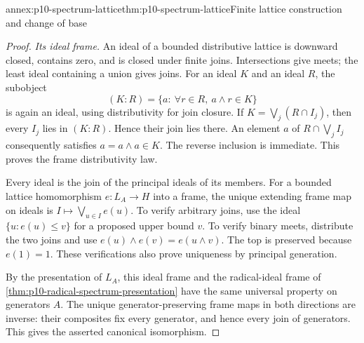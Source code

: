 \begin{annexitem}{annex:p10-spectrum-lattice}{thm:p10-spectrum-lattice}{Finite lattice construction and change of base}
\begin{proof}
\emph{Its ideal frame.}
An ideal of a bounded distributive lattice is downward closed,
contains zero, and is closed under finite joins.
Intersections give meets; the least ideal containing a union gives
joins. For an ideal \(K\) and an ideal \(R\), the subobject
\[
 (K:R)=\{a:\ \forall r\in R,\ a\wedge r\in K\}
\]
is again an ideal, using distributivity for join closure.
If \(K=\bigvee_j(R\cap I_j)\), then every \(I_j\) lies in
\((K:R)\). Hence their join lies there.
An element \(a\) of \(R\cap\bigvee_j I_j\) consequently satisfies
\(a=a\wedge a\in K\). The reverse inclusion is immediate.
This proves the frame distributivity law.

Every ideal is the join of the principal ideals of its members.
For a bounded lattice homomorphism \(e:L_A\to H\) into a frame,
the unique extending frame map on ideals is
\(I\mapsto\bigvee_{u\in I}e(u)\).
To verify arbitrary joins, use the ideal
\(\{u:e(u)\leq v\}\) for a proposed upper bound \(v\).
To verify binary meets, distribute the two joins and use
\(e(u)\wedge e(v)=e(u\wedge v)\).
The top is preserved because \(e(1)=1\).
These verifications also prove uniqueness by principal generation.

By the presentation of \(L_A\), this ideal frame and the
radical-ideal frame of
\cref{thm:p10-radical-spectrum-presentation}
have the same universal property on generators \(A\).
The unique generator-preserving frame maps in both directions
are inverse: their composites fix every generator, and hence
every join of generators.
This gives the asserted canonical isomorphism.
\end{proof}
\end{annexitem}

